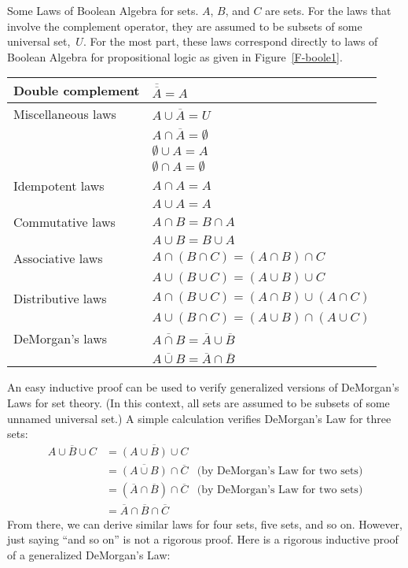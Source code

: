   {Some Laws of Boolean Algebra for sets.  $A$, $B$, and $C$ are
  sets.  For the laws that involve the complement operator, 
  they are assumed to be subsets of some universal set,~$U$.
  For the most part, these laws correspond directly to laws
  of Boolean Algebra for propositional logic as given in
  Figure~\ref{F-boole1}.}
  {\begin{tabular}{|l|l|}
      \hline
      \strut Double complement&   \bigstrut$\overline{\overline{A}}=A$\\
      \hline
      \strut Miscellaneous laws&   $A\cup\overline{A}=U$\\
      \strut&    $A\cap\overline{A}=\emptyset$\\
      \strut&    $\emptyset\cup A=A$\\
      \strut&    $\emptyset\cap A=\emptyset$\\
      \hline
      \strut Idempotent laws&    $A\cap A= A$\\
      \strut&                   $A\cup A= A$\\
      \hline
      \strut Commutative laws&   $A\cap B = B\cap A$\\
      \strut&                   $A\cup B=B\cup A$\\
      \hline
      \strut Associative laws&   $A\cap (B\cap C) = (A\cap B)\cap C$\\
      \strut&                   $A\cup (B\cup C) = (A\cup B)\cup C$\\
      \hline
      \strut Distributive laws&  $A\cap(B\cup C) = (A\cap B)\cup (A\cap C)$\\
      \strut&                   $A\cup (B\cap C) = (A\cup B)\cap (A\cup C)$\\
      \hline
      \strut DeMorgan's laws&   $\overline{A\cap B} = \overline{A}\cup\overline{B}$\\
      \strut&                   $\overline{A\cup B} = \overline{A}\cap\overline{B}$\\
      \hline
   \end{tabular}
  }

\medbreak

An easy inductive proof
can be used to verify generalized versions of DeMorgan's Laws
for set theory.  
(In this context, all sets are assumed to be subsets of some unnamed
universal set.)  A simple calculation verifies DeMorgan's
Law for three sets:
\begin{align*}
   \overline{A\cup B\cup C}&=\overline{(A\cup B)\cup C}\\
             &=\overline{(A\cup B)}\cap\overline{C} &\text{(by DeMorgan's Law for two sets)}\\
             &=(\overline{A}\cap\overline{B})\cap\overline{C} &\text{(by DeMorgan's Law for two sets)}\\
             &=\overline{A}\cap\overline{B}\cap\overline{C}
\end{align*}
From there, we can derive similar laws for four sets, five sets, and
so on.  However, just saying ``and so on'' is not a rigorous
proof.  Here is a rigorous inductive proof of a generalized
DeMorgan's Law:


